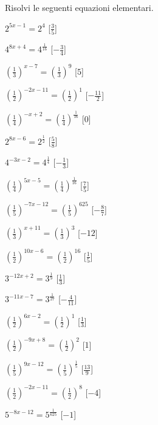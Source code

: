 \begin{esercizio}\label{ese:}
 Risolvi le seguenti equazioni elementari.
\begin{multicols}{2}
 \begin{enumeratea}
  \item  \(2^{5 x -1} = 2^{4}\)
   \hfill [\(\frac{3}{5}\)]
  \item  \(4^{8 x +4} = 4^{\frac{1}{16}}\)
   \hfill [\(-\frac{3}{4}\)]
  \item  \(\left(\frac{1}{3}\right)^{x -7} = \left(\frac{1}{3}\right)^{9}\)
   \hfill [\(5\)]
  \item  \(\left(\frac{1}{2}\right)^{-2 x -11} = \left(\frac{1}{2}\right)^{1}\)
   \hfill [\(-\frac{11}{2}\)]
  \item  \(\left(\frac{1}{4}\right)^{- x +2} = 
\left(\frac{1}{4}\right)^{\frac{1}{16}}\)
   \hfill [\(0\)]
  \item  \(2^{8 x -6} = 2^{\frac{1}{2}}\)
   \hfill [\(\frac{5}{8}\)]
  \item  \(4^{-3 x -2} = 4^{\frac{1}{4}}\)
   \hfill [\(-\frac{1}{3}\)]
  \item  \(\left(\frac{1}{4}\right)^{5 x -5} = 
\left(\frac{1}{4}\right)^{\frac{1}{16}}\)
   \hfill [\(\frac{7}{5}\)]
  \item  \(\left(\frac{1}{5}\right)^{-7 x -12} = 
\left(\frac{1}{5}\right)^{625}\)
   \hfill [\(-\frac{8}{7}\)]
  \item  \(\left(\frac{1}{3}\right)^{x +11} = \left(\frac{1}{3}\right)^{3}\)
   \hfill [\(-12\)]
  \item  \(\left(\frac{1}{2}\right)^{10 x -6} = \left(\frac{1}{2}\right)^{16}\)
   \hfill [\(\frac{1}{5}\)]
  \item  \(3^{-12 x +2} = 3^{\frac{1}{9}}\)
   \hfill [\(\frac{1}{3}\)]
  \item  \(3^{-11 x -7} = 3^{\frac{1}{27}}\)
   \hfill [\(-\frac{4}{11}\)]
  \item  \(\left(\frac{1}{2}\right)^{6 x -2} = \left(\frac{1}{2}\right)^{1}\)
   \hfill [\(\frac{1}{3}\)]
  \item  \(\left(\frac{1}{2}\right)^{-9 x +8} = \left(\frac{1}{2}\right)^{2}\)
   \hfill [\(1\)]
  \item  \(\left(\frac{1}{5}\right)^{9 x -12} = 
\left(\frac{1}{5}\right)^{\frac{1}{5}}\)
   \hfill [\(\frac{13}{9}\)]
  \item  \(\left(\frac{1}{2}\right)^{-2 x -11} = \left(\frac{1}{2}\right)^{8}\)
   \hfill [\(-4\)]
  \item  \(5^{-8 x -12} = 5^{\frac{1}{625}}\)
   \hfill [\(-1\)]

\end{enumeratea}
\end{multicols}
\end{esercizio}
